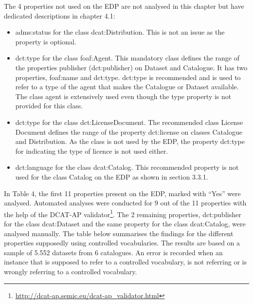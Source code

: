 \documentclass[<options>]{elsarticle}
\begin{document}
The 4 properties not used on the EDP are not analysed in this chapter but have dedicated descriptions in chapter 4.1:

\begin{itemize}
\item adms:status for the class dcat:Distribution. This is not an issue as the property is optional.
\item dct:type for the class foaf:Agent. This mandatory class defines the range of the properties publisher (dct:publisher) on Dataset and Catalogue. It has two properties, foaf:name and dct:type. dct:type is recommended and is used to refer to a type of the agent that makes the Catalogue or Dataset available. The class agent is extensively used even though the type property is not provided for this class.
\item dct:type for the class dct:LicenseDocument. The recommended class License Document defines the range of the property dct:license on classes Catalogue and Distribution. As the class is not used by the EDP, the property dct:type for indicating the type of licence is not used either.
\item dct:language for the class dcat:Catalog. This recommended property is not used for the class Catalog on the EDP as shown in section 3.3.1.
\end{itemize}

In Table 4, the first 11 properties present on the EDP, marked with “Yes” were analysed. Automated analyses were conducted for 9 out of the 11 properties with the help of the DCAT-AP validator\footnote{\href{  http://dcat-ap.semic.eu/dcat-ap\_validator.html }{    http://dcat-ap.semic.eu/dcat-ap\_validator.html}}. The 2 remaining properties, dct:publisher for the class dcat:Dataset and the same property for the class dcat:Catalog, were analysed manually. 
The table below summarises the findings for the different properties supposedly using controlled vocabularies. The results are based on a sample of 5.552 datasets from 6 catalogues. An error is recorded when an instance that is supposed to refer to a controlled vocabulary, is not referring or is wrongly referring to a controlled vocabulary.
\end{document}
